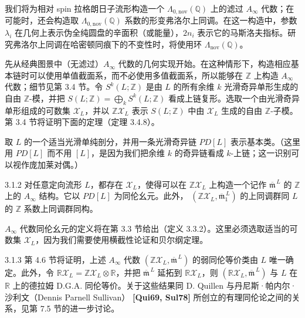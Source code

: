 我们将为相对 spin 拉格朗日子流形构造一个
$\Lambda_{0,\mathrm{nov}}(\mathbb Q)$ 上的滤过 $A_\infty$ 代数；在可能时，还会构造取
$\Lambda_{0,\mathrm{nov}}(\mathbb Q)$ 系数的形变弗洛尔上同调。在这一构造中，参数
$\lambda_i$ 在几何上表示伪全纯圆盘的辛面积（或能量），$2n_i$ 表示它的马斯洛夫指标。研究弗洛尔上同调在哈密顿同痕下的不变性时，将使用环
$\Lambda_{\mathrm{nov}}(\mathbb Q)$。

先从经典图景中（无滤过）$A_\infty$ 代数的几何实现开始。在这种情形下，构造相应基本链时可以使用单值截面系，而不必使用多值截面系，所以能够在 $\mathbb Z$ 上构造
$A_\infty$ 代数；细节见第 3.4 节。令 $S^k(L;\mathbb Z)$ 是由 $L$ 的所有余维
$k$ 光滑奇异单形生成的自由 $\mathbb Z$-模，并把
$S(L;\mathbb Z)=\bigoplus_kS^k(L;\mathbb Z)$ 看成上链复形。选取一个由光滑奇异单形组成的可数集 $\mathcal X_L$，并以
$\mathbb Z\mathcal X_L$ 表示 $S(L;\mathbb Z)$ 中由 $\mathcal X_L$ 生成的自由
$\mathbb Z$-子模。第 3.4 节将证明下面的定理（定理 3.4.8）。

取 $L$ 的一个适当光滑单纯剖分，并用一条光滑奇异链 $PD[L]$ 表示基本类。（这里用
$PD[L]$ 而不用 $[L]$，是因为我们把余维 $k$ 的奇异链看成 $k$-上链；这一识别可以视作庞加莱对偶。）

\begin{theorem}{3.1.2}\label{thm:3-1-2}
对任意定向流形 $L$，都存在 $\mathcal X_L$，使得可以在
$\mathbb Z\mathcal X_L$ 上构造一个记作 $\overline{\mathfrak m}^{\,L}$ 的
$\mathbb Z$ 上的 $A_\infty$ 结构。它以 $PD[L]$ 为同伦幺元。此外，
$(\mathbb Z\mathcal X_L,\overline{\mathfrak m}_1^{\,L})$ 的上同调群同 $L$ 的
$\mathbb Z$ 系数上同调群同构。
\end{theorem}

$A_\infty$ 代数同伦幺元的定义将在第 3.3 节给出（定义 3.3.2）。这里必须选取适当的可数集 $\mathcal X_L$，因为我们需要使用横截性论证和贝尔纲定理。

\begin{remark}{3.1.3}\label{rem:3-1-3}
第 4.6 节将证明，上述 $A_\infty$ 代数
$(\mathbb Z\mathcal X_L,\overline{\mathfrak m}^{\,L})$ 的弱同伦等价类由 $L$ 唯一确定。此外，令
$\mathbb R\mathcal X_L=\mathbb Z\mathcal X_L\otimes\mathbb R$，并把
$\overline{\mathfrak m}^{\,L}$ 延拓到 $\mathbb R\mathcal X_L$，则
$(\mathbb R\mathcal X_L,\overline{\mathfrak m}^{\,L})$ 与 $L$ 在 $\mathbb R$ 上的德拉姆 D.G.A. 同伦等价。关于这些结果同 D. Quillen 与丹尼斯·帕内尔·沙利文（Dennis Parnell Sullivan）
\textbf{[Qui69, Sul78]} 所创立的有理同伦论之间的关系，见第 7.5 节的进一步讨论。
\end{remark}

